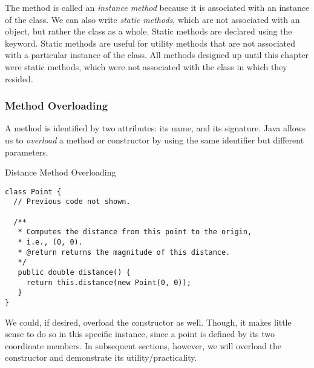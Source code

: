 The  method is called an \textit{instance method} because it is associated with an instance of the class. We can also write \textit{static methods}, which are not associated with an object, but rather the class as a whole. Static methods are declared using the  keyword. Static methods are useful for utility methods that are not associated with a particular instance of the class. All methods designed up until this chapter were static methods, which were not associated with the class in which they resided.

\subsubsection*{Method Overloading}
A method is identified by two attributes: its name, and its signature. Java allows us to \textit{overload} a method or constructor by using the same identifier but different parameters.


\begin{cl}[]{Distance Method Overloading}
\begin{lstlisting}[language=MyJava]
class Point {
  // Previous code not shown.
  
  /**
   * Computes the distance from this point to the origin,
   * i.e., (0, 0).
   * @return returns the magnitude of this distance.
   */
   public double distance() {
     return this.distance(new Point(0, 0));
   }
}
\end{lstlisting}
\end{cl} 

We could, if desired, overload the  constructor as well. Though, it makes little sense to do so in this specific instance, since a point is defined by its two coordinate members. In subsequent sections, however, we will overload the constructor and demonstrate its utility/practicality.


